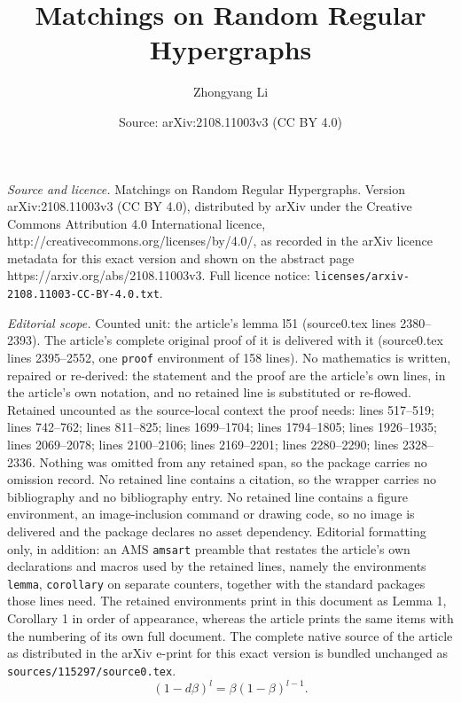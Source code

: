 \documentclass[10pt,a4paper]{amsart}
\title{Matchings on Random Regular Hypergraphs}
\author{Zhongyang Li}
\date{Source: arXiv:2108.11003v3 (CC BY 4.0)}
\begin{document}
\maketitle

\noindent\emph{Source and licence.} Matchings on Random Regular Hypergraphs. Version arXiv:2108.11003v3 (CC BY 4.0), distributed by arXiv under the Creative Commons Attribution 4.0 International licence, http://creativecommons.org/licenses/by/4.0/, as recorded in the arXiv licence metadata for this exact version and shown on the abstract page https://arxiv.org/abs/2108.11003v3. Full licence notice: \texttt{licenses/arxiv-2108.11003-CC-BY-4.0.txt}.\par\smallskip

\noindent\textit{Editorial scope.} Counted unit: the article's lemma l51 (source0.tex lines 2380--2393). The article's complete original proof of it is delivered with it (source0.tex lines 2395--2552, one \texttt{proof} environment of 158 lines). No mathematics is written, repaired or re-derived: the statement and the proof are the article's own lines, in the article's own notation, and no retained line is substituted or re-flowed.  Retained uncounted as the source-local context the proof needs: lines 517--519; lines 742--762; lines 811--825; lines 1699--1704; lines 1794--1805; lines 1926--1935; lines 2069--2078; lines 2100--2106; lines 2169--2201; lines 2280--2290; lines 2328--2336.  Nothing was omitted from any retained span, so the package carries no omission record.  No retained line contains a citation, so the wrapper carries no bibliography and no bibliography entry.  No retained line contains a figure environment, an image-inclusion command or drawing code, so no image is delivered and the package declares no asset dependency.  Editorial formatting only, in addition: an AMS \texttt{amsart} preamble that restates the article's own declarations and macros used by the retained lines, namely the environments \texttt{lemma}, \texttt{corollary} on separate counters, together with the standard packages those lines need.  The retained environments print in this document as Lemma 1, Corollary 1 in order of appearance, whereas the article prints the same items with the numbering of its own full document.  The complete native source of the article as distributed in the arXiv e-print for this exact version is bundled unchanged as \texttt{sources/115297/source0.tex}.
\begin{equation}\label{eq1}
  (1-d\beta)^l=\beta(1-\beta)^{l-1}.
\end{equation}
\end{document}
